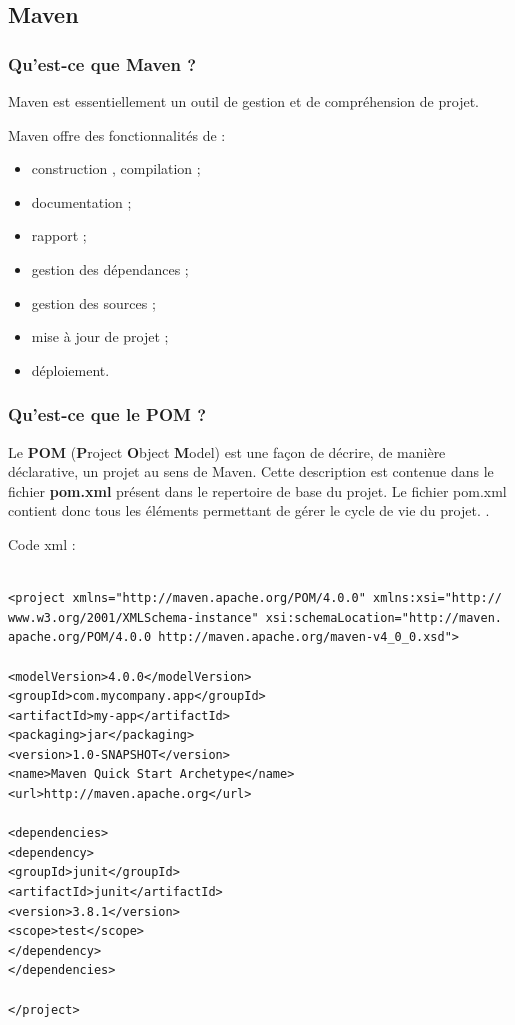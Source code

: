 \subsection{Maven} 
\subsubsection{Qu'est-ce que Maven ?}


Maven est essentiellement un outil de gestion et de compréhension de projet. 

Maven offre des fonctionnalités de :
\begin{itemize}
\item construction , compilation ;
\item documentation ;
\item  rapport ;
\item  gestion des dépendances ;
\item  gestion des sources ;
\item mise à jour de projet ;
\item  déploiement.
\end{itemize}

\subsubsection{Qu'est-ce que le POM ?}
Le \textbf{POM} (\textbf{P}roject \textbf{O}bject \textbf{M}odel) est une façon de décrire, de manière déclarative, un projet au sens de Maven. Cette description est contenue dans le fichier \textbf{pom.xml} présent dans le repertoire de base du projet. Le fichier pom.xml contient donc tous les éléments permettant de gérer le cycle de vie du projet. \cite{maven}.

Code xml :	
 \lstset{language=XML}
\begin{lstlisting}

<project xmlns="http://maven.apache.org/POM/4.0.0" xmlns:xsi="http://
www.w3.org/2001/XMLSchema-instance" xsi:schemaLocation="http://maven.
apache.org/POM/4.0.0 http://maven.apache.org/maven-v4_0_0.xsd"> 

<modelVersion>4.0.0</modelVersion> 
<groupId>com.mycompany.app</groupId> 
<artifactId>my-app</artifactId> 
<packaging>jar</packaging> 
<version>1.0-SNAPSHOT</version> 
<name>Maven Quick Start Archetype</name> 
<url>http://maven.apache.org</url> 

<dependencies> 
<dependency> 
<groupId>junit</groupId> 
<artifactId>junit</artifactId> 
<version>3.8.1</version> 
<scope>test</scope> 
</dependency> 
</dependencies> 

</project>

\end{lstlisting}

